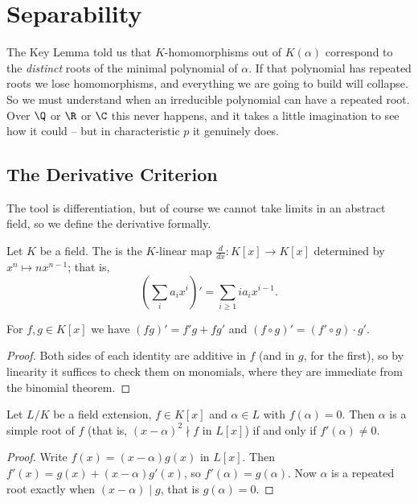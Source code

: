 \section{Separability}

The Key Lemma told us that $K$-homomorphisms out of $K(\alpha)$ correspond to the \emph{distinct} roots of the minimal polynomial of $\alpha$. If that polynomial has repeated roots we lose homomorphisms, and everything we are going to build will collapse. So we must understand when an irreducible polynomial can have a repeated root. Over $\Q$ or $\R$ or $\C$ this never happens, and it takes a little imagination to see how it could -- but in characteristic $p$ it genuinely does.

\subsection{The Derivative Criterion}

The tool is differentiation, but of course we cannot take limits in an abstract field, so we define the derivative formally.

\begin{definition}
	Let $K$ be a field. The  is the $K$-linear map $\frac{d}{dx} : K[x] \to K[x]$ determined by $x^n \mapsto n x^{n-1}$; that is,
	$$\left(\sum_{i} a_i x^i\right)' = \sum_{i \geq 1} i a_i x^{i-1}.$$
\end{definition}

\begin{proposition}
	For $f, g \in K[x]$ we have $(fg)' = f'g + fg'$ and $(f \circ g)' = (f' \circ g)\cdot g'$.
\end{proposition}

\begin{proof}
	Both sides of each identity are additive in $f$ (and in $g$, for the first), so by linearity it suffices to check them on monomials, where they are immediate from the binomial theorem.
\end{proof}

\begin{lemma}\label{lem:simpleroot}
	Let $L/K$ be a field extension, $f \in K[x]$ and $\alpha \in L$ with $f(\alpha) = 0$. Then $\alpha$ is a simple root of $f$ (that is, $(x-\alpha)^2 \nmid f$ in $L[x]$) if and only if $f'(\alpha) \neq 0$.
\end{lemma}

\begin{proof}
	Write $f(x) = (x-\alpha)g(x)$ in $L[x]$. Then $f'(x) = g(x) + (x-\alpha)g'(x)$, so $f'(\alpha) = g(\alpha)$. Now $\alpha$ is a repeated root exactly when $(x-\alpha) \mid g$, that is $g(\alpha) = 0$.
\end{proof}

